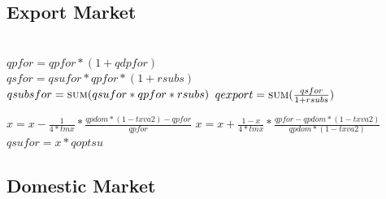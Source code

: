 \documentclass{article}
\begin{document}
\subsection{Export Market}

\begin{algorithm}[H]
\caption{Export Market}
    \begin{algorithmic}
        \State {}
        \EndFor
        \\
        \State \(qpfor = qpfor * (1 + qdpfor)\)
        \EndFor
        \\
        \State \(qsfor = qsufor * qpfor * (1 + rsubs)\)
        \EndFor
        \\
        \State \(qsubsfor = \Call{sum}{qsufor * qpfor * rsubs}\)
        \State \(qexport = \Call{sum}{\frac{qsfor}{1 + rsubs}}\)
        \EndFunction
    \end{algorithmic}
\end{algorithm}

\begin{algorithm}[!htbp]
\caption{Adjust Foreign}
    \begin{algorithmic}
        \State \(x = x - \frac{1}{4 * tmx} * \frac{qpdom * (1 - txva2) - qpfor}{qpfor}\)
        \Else
        \State \(x = x + \frac{1 - x}{4 * tmx} * \frac{qpfor - qpdom * (1 - txva2)}{qpdom * (1 - txva2)}\)
        \EndIf
        \\
        \State \(qsufor = x * qoptsu\)
        \EndFunction
    \end{algorithmic}
\end{algorithm}

\clearpage
\subsection{Domestic Market}

\begin{algorithm}[H]
\caption{Domestic Market}
    \begin{algorithmic}
        \State {}
        \State {}
        \State {}
        \State {}
        \State {}
        \State {}
        \State {}
        \State {}
        \EndFunction
    \end{algorithmic}
\end{algorithm}
\end{document}
